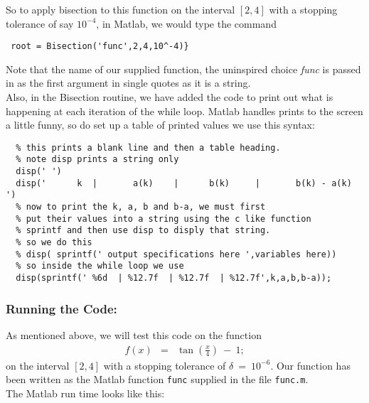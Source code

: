 \documentclass[11pt]{SelfArxOneColBMN}
\begin{document}
\noindent
So to apply bisection to this function on the
interval $[2,4]$ with a stopping tolerance of say
$10^{-4}$, in Matlab, we would type the command

\singlespacing
{}
\begin{lstlisting}
 root = Bisection('func',2,4,10^-4)}
\end{lstlisting}
\lstset{fancyvrb=false}
\onehalfspacing

\noindent
Note that the name of our supplied function, the uninspired
choice {\em func} is passed in as the first argument in single
quotes as it is a string.\\

\noindent
Also, in the Bisection routine, we have added the code to
print out what is happening at each iteration of the while loop.
Matlab handles prints to the screen a little funny, so do set up
a table of printed values we use this syntax:

\singlespacing
{}
\begin{lstlisting}
  % this prints a blank line and then a table heading.
  % note disp prints a string only
  disp(' ')
  disp('      k  |       a(k)    |      b(k)     |       b(k) - a(k) ')
  % now to print the k, a, b and b-a, we must first
  % put their values into a string using the c like function
  % sprintf and then use disp to disply that string.
  % so we do this 
  % disp( sprintf(' output specifications here ',variables here))
  % so inside the while loop we use
  disp(sprintf(' %6d  | %12.7f  | %12.7f  | %12.7f',k,a,b,b-a));
\end{lstlisting}
\lstset{fancyvrb=false}
\onehalfspacing

\subsubsection{Running the Code:}

As mentioned above, we will test this code on the function
\begin{eqnarray*}
f(x) &=& \tan(\frac{x}{4}) \: - \: 1;
\end{eqnarray*}
\noindent
on the interval $[2,4]$ with a stopping tolerance of
$\delta \: = \: 10^{-6}$.  Our function has been
written as the Matlab function {\tt func} supplied in
the file {\tt func.m}.\\

\noindent
The Matlab run time looks like this:

\singlespacing

\onehalfspacing
\end{document}
